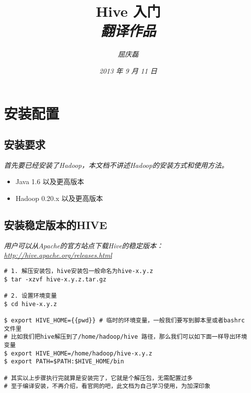 \documentclass{article}
\begin{document}
\title{%
  {\huge \textsf{Hive 入门}\\\smallskip}%
  {\small \textit{翻译作品}}
}

\author{\textit{屈庆磊}\\[2mm]
       }

\date{\textit{2013 年 9 月 11 日}}

\maketitle
\begin{multicols}{2}
\tableofcontents
\end{multicols}


\section{安装配置}
\subsection{安装要求}
\textit{
首先要已经安装了Hadoop，本文档不讲述Hadoop的安装方式和使用方法。
}

\begin{itemize}
\item Java 1.6 以及更高版本
\item Hadoop 0.20.x 以及更高版本
\end{itemize}

\subsection{安装稳定版本的HIVE}
\textit{
用户可以从Apache的官方站点下载Hive的稳定版本：\url{http://hive.apache.org/releases.html}
}

\begin{verbatim}
# 1. 解压安装包，hive安装包一般命名为hive-x.y.z 
$ tar -xzvf hive-x.y.z.tar.gz

# 2. 设置环境变量
$ cd hive-x.y.z

$ export HIVE_HOME={{pwd}} # 临时的环境变量，一般我们要写到脚本里或者bashrc 文件里
# 比如我们把hive解压到了/home/hadoop/hive 路径，那么我们可以如下面一样导出环境变量
$ export HIVE_HOME=/home/hadoop/hive-x.y.z
$ export PATH=$PATH:$HIVE_HOME/bin

# 其实以上步骤执行完就算是安装完了，它就是个解压包，无需配置过多
# 至于编译安装，不再介绍，看官网的吧，此文档为自己学习使用，为加深印象
\end{verbatim}
\end{document}
